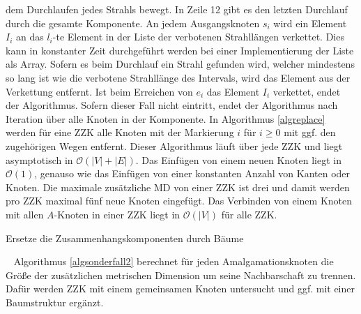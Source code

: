 dem Durchlaufen jedes Strahls bewegt. In Zeile 12 gibt es den letzten Durchlauf durch die gesamte Komponente. An jedem Ausgangsknoten $s_i$ wird ein Element $I_i$ an das $l_i$-te Element in der Liste der verbotenen Strahllängen verkettet. Dies kann in konstanter Zeit durchgeführt werden bei einer Implementierung der Liste als Array. Sofern es beim Durchlauf ein Strahl gefunden wird, welcher mindestens so lang ist wie die verbotene Strahllänge des Intervals, wird das Element aus der Verkettung entfernt. Ist beim Erreichen von $e_i$ das Element $I_i$ verkettet, endet der Algorithmus. Sofern dieser Fall nicht eintritt, endet der Algorithmus nach Iteration über alle Knoten in der Komponente.\newpage
In Algorithmus \ref{algreplace} werden für eine ZZK alle Knoten mit der Markierung $i$ für $i \geq 0$ mit ggf. den zugehörigen Wegen entfernt. Dieser Algorithmus läuft über jede ZZK und liegt asymptotisch in $\mathcal{O}(|V|+|E|)$.
Das Einfügen von einem neuen Knoten liegt in $\mathcal{O}(1)$, genauso wie das Einfügen von einer konstanten Anzahl von Kanten oder Knoten. Die maximale zusätzliche MD von einer ZZK ist drei und damit werden pro ZZK maximal fünf neue Knoten eingefügt. Das Verbinden von einem Knoten mit allen $A$-Knoten in einer ZZK liegt in $\mathcal{O}(|V|)$ für alle ZZK.\\
\vspace{-5mm}
\begin{algorithm}
\caption{Ersetze die Zusammenhangskomponenten durch Bäume}
\begin{algorithmic}[1]
\vspace{2mm}
\ENDFOR
\vspace{2mm}
\end{algorithmic}
\label{algreplace}
\end{algorithm}
\vspace{-3mm}
~\linebreak
Algorithmus \ref{algsonderfall2} berechnet für jeden Amalgamationsknoten die Größe der zusätzlichen metrischen Dimension um seine Nachbarschaft zu trennen. Dafür werden ZZK mit einem gemeinsamen Knoten untersucht und ggf. mit einer Baumstruktur ergänzt.\vspace{-1mm}\newline\newline %
